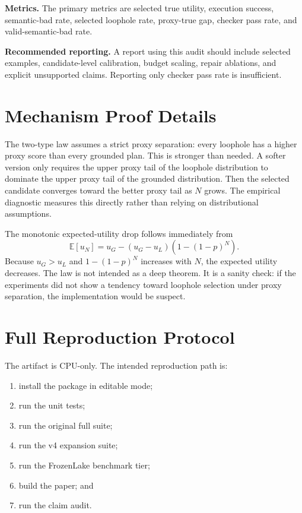 \documentclass{article}
\begin{document}
\textbf{Metrics.} The primary metrics are selected true utility, execution
success, semantic-bad rate, selected loophole rate, proxy-true gap, checker
pass rate, and valid-semantic-bad rate.

\textbf{Recommended reporting.} A report using this audit should include
selected examples, candidate-level calibration, budget scaling, repair
ablations, and explicit unsupported claims. Reporting only checker pass rate is
insufficient.

\section{Mechanism Proof Details}

The two-type law assumes a strict proxy separation: every loophole has a higher
proxy score than every grounded plan. This is stronger than needed. A softer
version only requires the upper proxy tail of the loophole distribution to
dominate the upper proxy tail of the grounded distribution. Then the selected
candidate converges toward the better proxy tail as $N$ grows. The empirical
diagnostic measures this directly rather than relying on distributional
assumptions.

The monotonic expected-utility drop follows immediately from
\[
\mathbb{E}[u_N] = u_G - (u_G-u_L)(1-(1-p)^N).
\]
Because $u_G>u_L$ and $1-(1-p)^N$ increases with $N$, the expected utility
decreases. The law is not intended as a deep theorem. It is a sanity check:
if the experiments did not show a tendency toward loophole selection under
proxy separation, the implementation would be suspect.

\section{Full Reproduction Protocol}

The artifact is CPU-only. The intended reproduction path is:
\begin{enumerate}
  \item install the package in editable mode;
  \item run the unit tests;
  \item run the original full suite;
  \item run the v4 expansion suite;
  \item run the FrozenLake benchmark tier;
  \item build the paper; and
  \item run the claim audit.
\end{enumerate}
\end{document}
